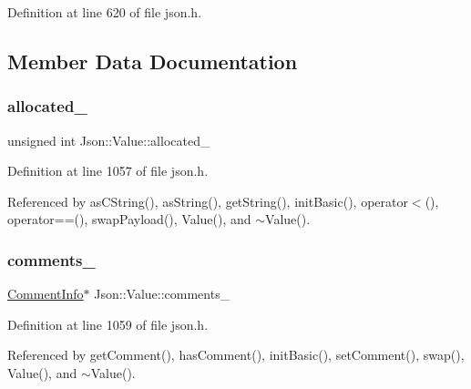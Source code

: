 Definition at line 620 of file json.\+h.



\subsection{Member Data Documentation}
\mbox{\label{class_json_1_1_value_ae0126c80dc4907aad94088553fc7632b}} 
\subsubsection{\texorpdfstring{allocated\+\_\+}{allocated\_}}
{\footnotesize\ttfamily unsigned int Json\+::\+Value\+::allocated\+\_\+\hspace{0.3cm}{\ttfamily [private]}}



Definition at line 1057 of file json.\+h.



Referenced by as\+C\+String(), as\+String(), get\+String(), init\+Basic(), operator$<$(), operator==(), swap\+Payload(), Value(), and $\sim$\+Value().

\mbox{\label{class_json_1_1_value_a2016564cabc7a29208e97bd0b782a4e4}} 
\subsubsection{\texorpdfstring{comments\+\_\+}{comments\_}}
{\footnotesize\ttfamily \hyperlink{struct_json_1_1_value_1_1_comment_info}{Comment\+Info}$\ast$ Json\+::\+Value\+::comments\+\_\+\hspace{0.3cm}{\ttfamily [private]}}



Definition at line 1059 of file json.\+h.



Referenced by get\+Comment(), has\+Comment(), init\+Basic(), set\+Comment(), swap(), Value(), and $\sim$\+Value().

\mbox{\label{class_json_1_1_value_afe377e25f6d3b5b8ea7221c84f29412a}} 
